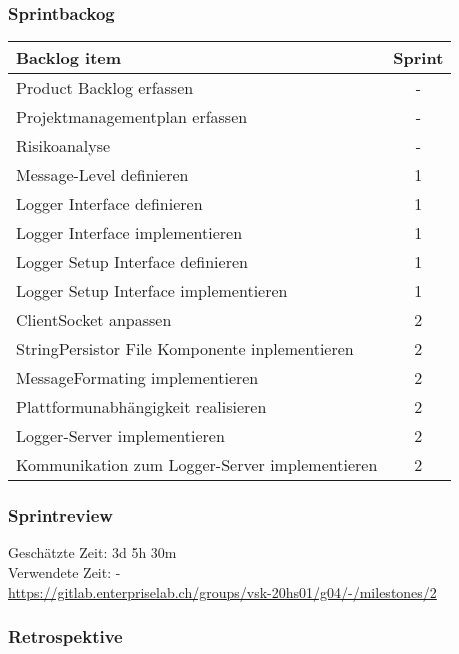 \subsubsection{Sprintbackog}
	\begin{tabularx}{\textwidth}{|p{}|c|}
		\hline
		\textbf{Backlog item} & \textbf{Sprint} \\
		\hline
		Product Backlog erfassen & -
\\
		\hline
		Projektmanagementplan erfassen & -
\\
		\hline
		Risikoanalyse & -
\\
		\hline
		Message-Level definieren & 1
\\
		\hline
		Logger Interface definieren & 1 \\
		\hline
		Logger Interface implementieren & 1
\\
		\hline
		Logger Setup Interface definieren & 1
\\
		\hline
		Logger Setup Interface implementieren & 1
\\
		\hline
		ClientSocket anpassen & 2\\ 
		\hline
		StringPersistor File Komponente inplementieren & 2 \\
		\hline
		MessageFormating implementieren & 2 \\
		\hline
		Plattformunabhängigkeit realisieren & 2 \\
		\hline
		Logger-Server implementieren & 2 \\
		\hline
		Kommunikation zum Logger-Server implementieren & 2 \\
		\hline
	\end{tabularx}
\subsubsection{Sprintreview}
Geschätzte Zeit: 3d 5h 30m\\ 
Verwendete Zeit: -
\\
\url{https://gitlab.enterpriselab.ch/groups/vsk-20hs01/g04/-/milestones/2}

\subsubsection{Retrospektive}